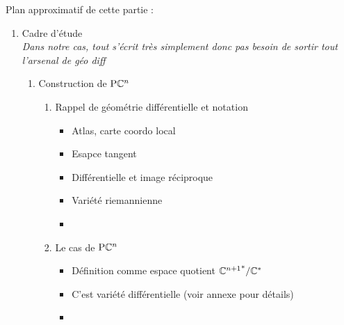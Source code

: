 
Plan approximatif de cette partie :

\begin{enumerate}[label=\Roman* --- ] \bfseries
	
	\item Cadre d'étude \\
	{\normalfont\itshape Dans notre cas, tout s'écrit très simplement donc pas besoin de sortir tout l'arsenal de géo diff}
	\begin{enumerate}[label=\arabic{enumi}.\arabic* --- ]
		
		\item Construction de $\text{\normalfont P}\mathbb{C}^{n}$
		\begin{enumerate}[label=\arabic{enumi}.1.\arabic* --- ]
			
			\item Rappel de géométrie différentielle et notation 
			\begin{itemize} \normalfont
				
				\item Atlas, carte coordo local
				
				\item Esapce tangent
				
				\item Différentielle et image réciproque
				
				\item Variété riemannienne
				
				\item {}
				
			\end{itemize}
			
			\item Le cas de $\text{\normalfont P}\mathbb{C}^{n}$
			\begin{itemize} \normalfont
				
				\item Définition comme espace quotient ${\mathbb{C}^{n+1}}^*/\mathbb{C}^*$
				
				\item C'est variété différentielle (voir annexe pour détails)
				
				\item {}
				
			\end{itemize}			
		\end{enumerate}
		

\end{enumerate}
\end{enumerate}
